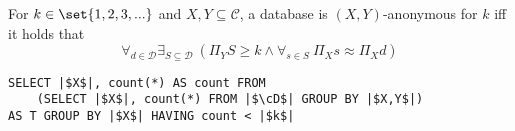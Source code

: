 \documentclass[12pt]{llncs}
\DeclarePairedDelimiter\set\{\}
\newcommand{\eqq}{\approx}
\newcommand{\Proj}[1]{\Pi_{#1}}
\newcommand{\cC}{\mathcal{C}}
\newcommand{\cD}{\mathcal{D}}
\begin{document}
\begin{definition}[$(X,Y)$-Privacy]
For $k \in \set{1,2,3,...}$ and $X,Y \subseteq \cC$, a database is $(X,Y)$-anonymous for $k$ iff it holds that
\[
\forall_{d \in \cD}
\exists_{S \subseteq \cD}\
(
\Proj{Y} S \geq k \wedge
\forall_{s \in S}\
\Proj{X} s \eqq \Proj{X} d
)
\]
\end{definition}

\begin{verbatim}
SELECT |$X$|, count(*) AS count FROM
    (SELECT |$X$|, count(*) FROM |$\cD$| GROUP BY |$X,Y$|)
AS T GROUP BY |$X$| HAVING count < |$k$|
\end{verbatim}
\end{document}
